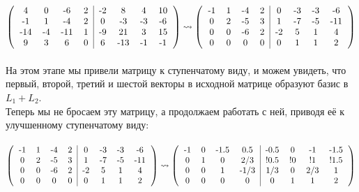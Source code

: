 \documentclass[a4paper,11pt]{report}
\begin{document}
\\
$
\begin{pmatrix}
\begin{tabular}{c c c c | c c c c}
 4 & 0 & -6 & 2 & -2 & 8 & 4 & 10\\
 -1 & 1 & -4 & 2 & 0 & -3 & -3 & -6\\
 -14 & -4 & -11 & 1 & -9 & 21 & 3 & 15\\
 9 & 3 & 6 & 0 & 6 & -13 & -1 & -1\\
\end{tabular}
\end{pmatrix}
\rightsquigarrow
\begin{pmatrix}
\begin{tabular}{c c c c | c c c c}
 -1 & 1 & -4 & 2 & 0 & -3 & -3 & -6\\
 0 & 2 & -5 & 3 & 1 & -7 & -5 & -11\\
 0 & 0 & -6 & 2 & -2 & 5 & 1 & 4\\
 0 & 0 & 0 & 0 & 0 & 1 & 1 & 2\\
\end{tabular}
\end{pmatrix}
$\\\\
На этом этапе мы привели матрицу к ступенчатому виду, и можем увидеть, что первый, второй, третий и шестой векторы в исходной матрице
образуют базис в $L_1 + L_2$. \\
Теперь мы не бросаем эту матрицу, а продолжаем работать с ней, приводя её к улучшенному ступенчатому виду:\\
\\
$
\begin{pmatrix}
\begin{tabular}{c c c c | c c c c}
 -1 & 1 & -4 & 2 & 0 & -3 & -3 & -6\\
 0 & 2 & -5 & 3 & 1 & -7 & -5 & -11\\
 0 & 0 & -6 & 2 & -2 & 5 & 1 & 4\\
 0 & 0 & 0 & 0 & 0 & 1 & 1 & 2\\
\end{tabular}
\end{pmatrix}
\rightsquigarrow
\begin{pmatrix}
\begin{tabular}{c c c c | c c c c}
 -1 & 0 & -1.5 & 0.5 & -0.5 & 0 & -1 & -1.5\\
 0 & 1 & 0 & 2/3 & !0.5 & !0 & !1 & !1.5\\
 0 & 0 & 1 & -1/3 & 1/3 & 0 & 2/3 & 1\\
 0 & 0 & 0 & 0 & 0 & 1 & 1 & 2\\
\end{tabular}
\end{pmatrix}
$\\\\
\end{document}
